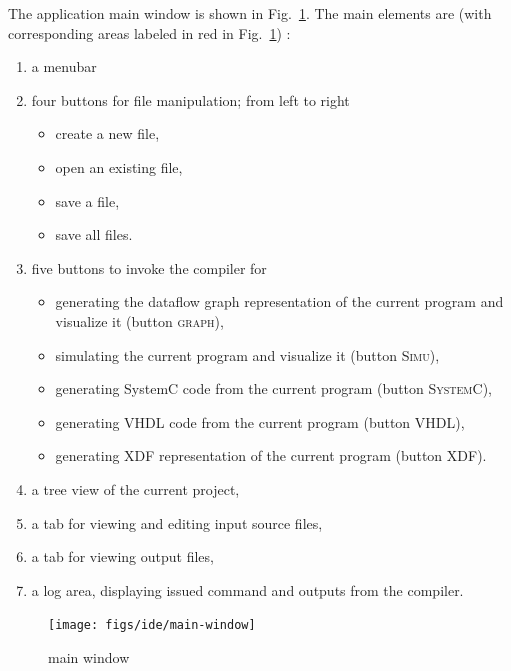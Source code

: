 \medskip
The application main window is shown in Fig.~\ref{fig:main-window}. 
The main elements are (with corresponding areas labeled in red in Fig.~\ref{fig:main-window}) :
\begin{enumerate}
\item a menubar
\item four buttons for file manipulation; from left to right
  \begin{itemize}
  \item create a new file,
  \item open an existing file,
  \item save a file,
  \item save all files.
  \end{itemize}
\item five buttons to invoke the compiler for
  \begin{itemize}
  \item generating the dataflow graph representation of the current program and visualize it (button \textsc{graph}),
  \item simulating the current program and visualize it (button \textsc{Simu}),
  \item generating SystemC code from the current program (button \textsc{SystemC}),
  \item generating VHDL code from the current program (button \textsc{VHDL}),
  \item generating XDF representation of the current program (button \textsc{XDF}).
  \end{itemize}
\item a tree view of the current project,
\item a tab for viewing and editing input source files,
\item a tab for viewing output files,
\item a log area, displaying issued command and outputs from the compiler.
\end{enumerate}

\begin{figure}[h]
  \centering
  \texttt{[image: figs/ide/main-window]}
  \caption{\caphy main window}
  \label{fig:main-window}
\end{figure}

